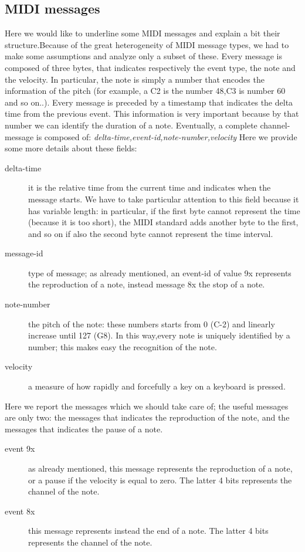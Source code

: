 \documentclass[12pt]{article}
\begin{document}
\subsection{MIDI messages}
Here we would like to underline some MIDI messages and explain a bit their structure.Because of the great heterogeneity of MIDI message types, we had to make some assumptions and analyze only a subset of these. Every message is composed of three bytes, that indicates respectively the event type, the note and the velocity. In particular, the note is simply a number that encodes the information of the pitch (for example, a C2 is the number 48,C3 is number 60 and so on..). 
Every message is preceded by a timestamp that indicates the delta time from the previous event. This information is very important because by that number we can identify the duration of a note. \newline
Eventually, a complete channel-message is composed of: \newline
\emph{delta-time,event-id,note-number,velocity} \newline
Here we provide some more details about these fields:\newline
\begin{description}
	\item[delta-time] it is the relative time from the current time and indicates when the message starts. We have to take particular attention to this field because it has variable length: in particular, if the first byte cannot represent the time (because it is too short), the MIDI standard adds another byte to the first, and so on if also the second byte cannot represent the time interval.
	\item[message-id] type of message; as already mentioned, an event-id of value 9x represents the reproduction of a note, instead message 8x the stop of a note.
	\item[note-number] the pitch of the note: these numbers starts from 0 (C-2) and linearly increase until 127 (G8). In this way,every note is uniquely identified by a number; this makes easy the recognition of the note.
	\item[velocity] a measure of how rapidly and forcefully a key on a keyboard is pressed.
\end{description}
Here we report the messages which we should take care of; the useful messages are only two: the messages that indicates the reproduction of the note, and the messages that indicates the pause of a note.
\begin{description} 
	\item[event 9x]  as already mentioned, this message represents the reproduction of a note, or a pause if the velocity is equal to zero. The latter 4 bits represents the channel of the note.
	\item[event 8x] this message represents instead the end of a note. The latter 4 bits represents the channel of the note.
\end{description}
\end{document}
